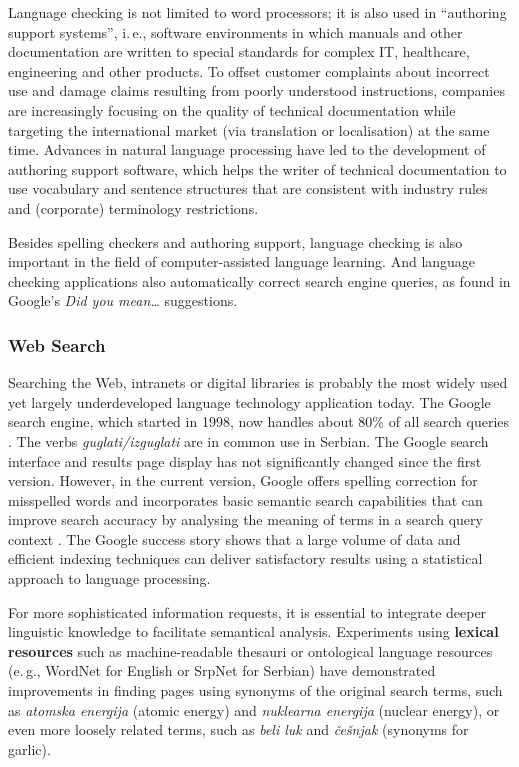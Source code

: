 \begin{multicols}{2}
Language checking is not limited to word processors; it is also used in “authoring support systems”, i.\,e., software environments in which manuals and other documentation are written to special standards for complex IT, healthcare, engineering and other products. To offset customer complaints about incorrect use and damage claims resulting from poorly understood instructions, companies are increasingly focusing on the quality of technical documentation while targeting the international market (via translation or localisation) at the same time. Advances in natural language processing have led to the development of authoring support software, which helps the writer of technical documentation to use vocabulary and sentence structures that are consistent with industry rules and (corporate) terminology restrictions. 


Besides spelling checkers and authoring support, language checking is also important in the field of computer-assisted language learning. And language checking applications also automatically correct search engine queries, as found in Google's \textit{Did you mean\ldots}  suggestions. 
 
 \subsubsection {Web Search}

Searching the Web, intranets or digital libraries is probably the most widely used yet largely underdeveloped language technology application today. The Google search engine, which started in 1998, now handles about 80\% of all search queries \cite{SPIEGEL}. The verbs \textit{guglati/izguglati} are in common use in Serbian. The Google search interface and results page display has not significantly changed since the first version. However, in the current version, Google offers spelling correction for misspelled words and incorporates basic semantic search capabilities that can improve search accuracy by analysing the meaning of terms in a search query context \cite{PCWORLD}. The Google success story shows that a large volume of data and efficient indexing techniques can deliver satisfactory results using a statistical approach to language processing.

For more sophisticated information requests, it is essential to integrate deeper linguistic knowledge to facilitate semantical analysis. Experiments using \textbf{lexical resources} such as machine-readable thesauri or ontological language resources (e.\,g., WordNet for English or SrpNet for Serbian) have demonstrated improvements in finding pages using synonyms of the original search terms, such as \textit{atomska energija} (atomic energy) and \textit{nuklearna energija} (nuclear energy), or even more loosely related terms, such as \textit{beli luk} and \textit{češnjak} (synonyms for garlic).


\end{multicols}
